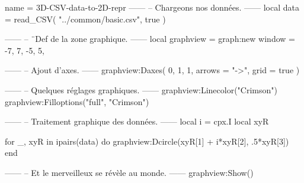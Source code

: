 \documentclass{standalone}
\begin{document}
\begin{luadraw}{name = 3D-CSV-data-to-2D-repr}
------
-- Chargeons nos données.
------
local data = read_CSV(
  "../common/basic.csv",
  true
)

------
-- ¨Def de la zone graphique.
------
local graphview = graph:new{
  window = {-7, 7, -5, 5},
}

------
-- Ajout d'axes.
------
graphview:Daxes(
  {0, 1, 1},
  {
    arrows = "->",
    grid   = true
  }
)

------
-- Quelques réglages graphiques.
------
graphview:Linecolor("Crimson")
graphview:Filloptions("full", "Crimson")

------
-- Traitement graphique des données.
------
local i = cpx.I
local xyR

for _, xyR in ipairs(data) do
  graphview:Dcircle(xyR[1] + i*xyR[2], .5*xyR[3])
end

------
-- Et le merveilleux se révèle au monde.
------
graphview:Show()
\end{luadraw}
\end{document}
